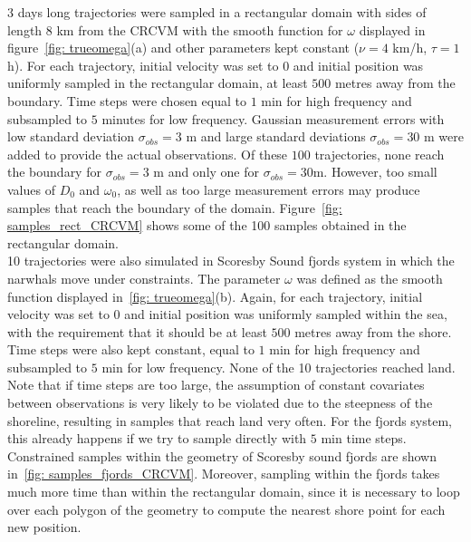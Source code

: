 \documentclass[11pt]{article}
\newcommand {\1}{\mathbb{1}}
\begin{document}
$3$ days long trajectories were sampled in a rectangular domain with sides of length $8$ km from the CRCVM with the smooth function for $\omega$ displayed in figure~\ref{fig: trueomega}(a) and other parameters kept constant ($\nu = 4$ km/h, $\tau=1$ h). For each trajectory, initial velocity was set to $0$ and initial position was uniformly sampled in the rectangular domain, at least $500$ metres away from the boundary. Time steps were chosen equal to $1$ min for high frequency and subsampled to $5$ minutes for low frequency. Gaussian measurement errors with low standard deviation $\sigma_{obs}=3$ m and large standard deviations $\sigma_{obs}=30$ m were added to provide the actual observations. Of these $100$ trajectories, none reach the boundary for $\sigma_{obs}=3$ m and only one for $\sigma_{obs}=30$m. However, too small values of $D_0$ and $\omega_0$, as well as too large measurement errors may produce samples that reach the boundary of the domain. Figure~\ref{fig: samples_rect_CRCVM} shows some of the 100 samples obtained in the rectangular domain. \\


10 trajectories were also simulated in Scoresby Sound fjords system in which the narwhals move under constraints. The parameter $\omega$ was defined as the smooth function displayed in~\ref{fig: trueomega}(b). Again, for each trajectory, initial velocity was set to $0$ and initial position was uniformly sampled within the sea, with the requirement that it should be at least $500$ metres away from the shore. Time steps were also kept constant, equal to $1$ min for high frequency and subsampled to $5$ min for low frequency. None of the 10 trajectories reached land. Note that if time steps are too large, the assumption of constant covariates between observations is very likely to be violated due to the steepness of the shoreline, resulting in samples that reach land very often. For the fjords system, this already happens if we try to sample directly with $5$ min time steps. Constrained samples within the geometry of Scoresby sound fjords are shown in~\ref{fig: samples_fjords_CRCVM}. Moreover, sampling within the fjords takes much more time than within the rectangular domain, since it is necessary to loop over each polygon of the geometry to compute the nearest shore point for each new position. 
\end{document}
